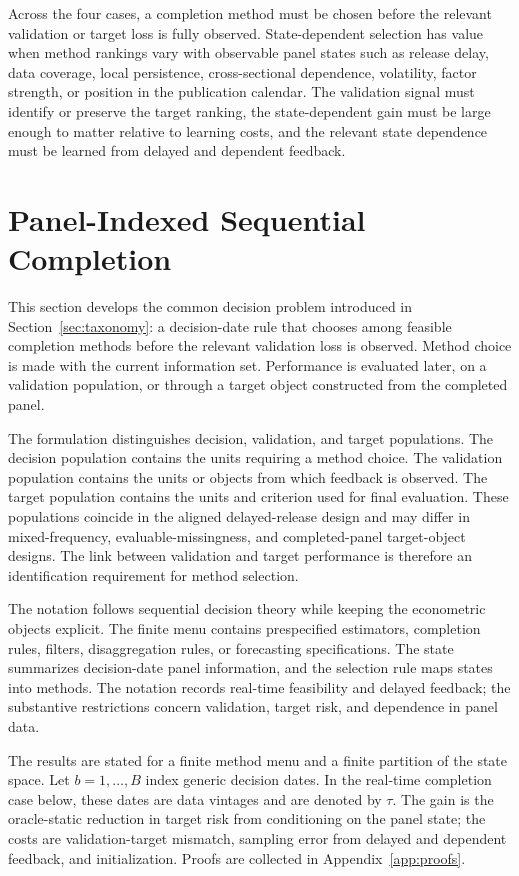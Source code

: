 \documentclass[a4paper, 12pt]{article}
\theoremstyle{plain}
\theoremstyle{remark}
\newcommand{\1}{\mathbf{1}}
\begin{document}
Across the four cases, a completion method must be chosen before the relevant validation or target loss is fully observed. State-dependent selection has value when method rankings vary with observable panel states such as release delay, data coverage, local persistence, cross-sectional dependence, volatility, factor strength, or position in the publication calendar. The validation signal must identify or preserve the target ranking, the state-dependent gain must be large enough to matter relative to learning costs, and the relevant state dependence must be learned from delayed and dependent feedback.

\section{Panel-Indexed Sequential Completion}
\label{sec:selection}

This section develops the common decision problem introduced in Section~\ref{sec:taxonomy}: a decision-date rule that chooses among feasible completion methods before the relevant validation loss is observed. Method choice is made with the current information set. Performance is evaluated later, on a validation population, or through a target object constructed from the completed panel.

The formulation distinguishes decision, validation, and target populations. The decision population contains the units requiring a method choice. The validation population contains the units or objects from which feedback is observed. The target population contains the units and criterion used for final evaluation. These populations coincide in the aligned delayed-release design and may differ in mixed-frequency, evaluable-missingness, and completed-panel target-object designs. The link between validation and target performance is therefore an identification requirement for method selection.

The notation follows sequential decision theory while keeping the econometric objects explicit. The finite menu contains prespecified estimators, completion rules, filters, disaggregation rules, or forecasting specifications. The state summarizes decision-date panel information, and the selection rule maps states into methods. The notation records real-time feasibility and delayed feedback; the substantive restrictions concern validation, target risk, and dependence in panel data.

The results are stated for a finite method menu and a finite partition of the state space. Let \(b=1,\ldots,B\) index generic decision dates. In the real-time completion case below, these dates are data vintages and are denoted by \(\tau\). The gain is the oracle-static reduction in target risk from conditioning on the panel state; the costs are validation-target mismatch, sampling error from delayed and dependent feedback, and initialization. Proofs are collected in Appendix~\ref{app:proofs}.
\end{document}
